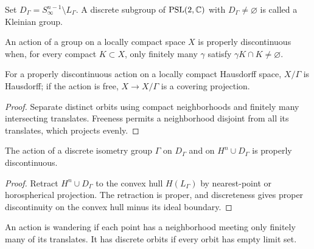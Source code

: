 \begin{definition}
\label{thurston-ch08-domain-discontinuity}
Set $D_\Gamma=S^{n-1}_\infty\setminus L_\Gamma$.  A discrete subgroup of $\operatorname{PSL}(2,\mathbb{C})$ with $D_\Gamma\neq\varnothing$ is called a Kleinian group.
\end{definition}

\begin{definition}
\label{thurston-ch08-proper-discontinuity}
An action of a group on a locally compact space $X$ is properly discontinuous when, for every compact $K\subset X$, only finitely many $\gamma$ satisfy $\gamma K\cap K\neq\varnothing$.
\end{definition}

\begin{proposition}
\label{thurston-ch08-proper-quotient}
For a properly discontinuous action on a locally compact Hausdorff space, $X/\Gamma$ is Hausdorff; if the action is free, $X\to X/\Gamma$ is a covering projection.
\end{proposition}
\begin{proof}\sketch Separate distinct orbits using compact neighborhoods and finitely many intersecting translates.  Freeness permits a neighborhood disjoint from all its translates, which projects evenly.\end{proof}

\begin{proposition}
\label{thurston-ch08-domain-proper}
The action of a discrete isometry group $\Gamma$ on $D_\Gamma$ and on $H^n\cup D_\Gamma$ is properly discontinuous.
\end{proposition}
\begin{proof}\sketch Retract $H^n\cup D_\Gamma$ to the convex hull $H(L_\Gamma)$ by nearest-point or horospherical projection.  The retraction is proper, and discreteness gives proper discontinuity on the convex hull minus its ideal boundary.\end{proof}

\begin{definition}
\label{thurston-ch08-wandering-discrete-orbits}
An action is wandering if each point has a neighborhood meeting only finitely many of its translates.  It has discrete orbits if every orbit has empty limit set.
\end{definition}

